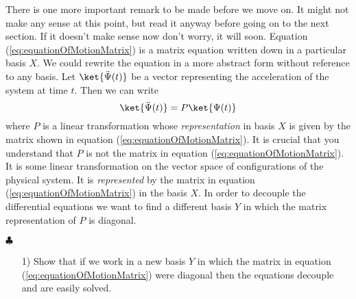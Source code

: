 There is one more important remark to be made before we move on.
It might not make any sense at this point, but read it anyway before going on to the next section.
If it doesn't make sense now don't worry, it will soon.
Equation (\ref{eq:equationOfMotionMatrix}) is a matrix equation written down in a particular basis $X$.
We could rewrite the equation in a more abstract form without reference to any basis.
Let $\ket{\ddot{\Psi}(t)}$ be a vector representing the acceleration of the system at time $t$.
Then we can write
\begin{equation}\label{eq:equationOfMotionAbstract}
\ket{\ddot{\Psi}(t)} = P \ket{\Psi (t)}
\end{equation}
where $P$ is a linear transformation whose \emph{representation} in basis $X$ is given by the matrix shown in equation (\ref{eq:equationOfMotionMatrix}).
It is crucial that you understand that $P$ is not the matrix in equation (\ref{eq:equationOfMotionMatrix}).
It is some linear transformation on the vector space of configurations of the physical system.
It is \emph{represented} by the matrix in equation (\ref{eq:equationOfMotionMatrix}) in the basis $X$.
In order to decouple the differential equations we want to find a different basis $Y$ in which the matrix representation of $P$ is diagonal.
\begin{flushright} $\clubsuit$ \end{flushright}

\begin{itemize}
\item[1)] Show that if we work in a new basis $Y$ in which the matrix in equation (\ref{eq:equationOfMotionMatrix}) were diagonal then the equations decouple and are easily solved.
\end{itemize}

